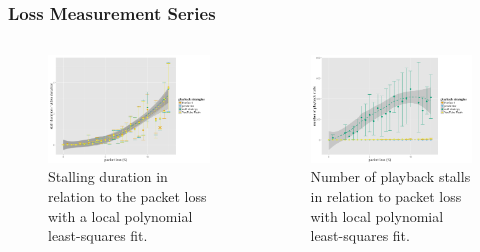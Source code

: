 \documentclass{beamer}
\begin{document}
\begin{frame}
	\frametitle{Loss Measurement Series}

	\begin{columns}[T]
		\begin{figure}
		\centering
		\includegraphics[width=1.0\columnwidth]{../../chapters/03-streaming/images/R-playbackemulation-stallduration-loss.pdf}
		\caption{Stalling duration in relation to the packet loss with a local polynomial least-squares fit.}
		\end{figure}

		\begin{figure}
			\centering
			\includegraphics[width=1.0\columnwidth]{../../chapters/03-streaming/images/R-playbackemulation-stallnumber-loss.pdf}
			\caption{Number of playback stalls in relation to packet loss with local polynomial least-squares fit.}
		\end{figure}
	\end{columns}
\end{frame}
\end{document}
